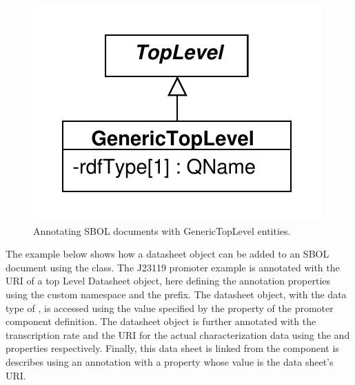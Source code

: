\begin{figure}[ht]
\begin{center}
\includegraphics[scale=0.6]{uml/generictoplevel}
\caption[]{Annotating SBOL documents with GenericTopLevel entities.}
\label{uml:generictoplevel}
\end{center}
\end{figure}

The example below shows how a datasheet object can be added to an SBOL document using the  class. 
The J23119 promoter example is annotated with the URI of a top Level Datasheet object, here defining the annotation properties using the custom  namespace and the  prefix. 
The datasheet object, with the data type of , is accessed using the  value specified by the  property of the promoter component definition. 
The datasheet object is further annotated with the transcription rate and the URI for the actual characterization data using the  and  properties respectively.
Finally, this data sheet is linked from the component is describes using an annotation with a  property whose value is the data sheet's URI.

